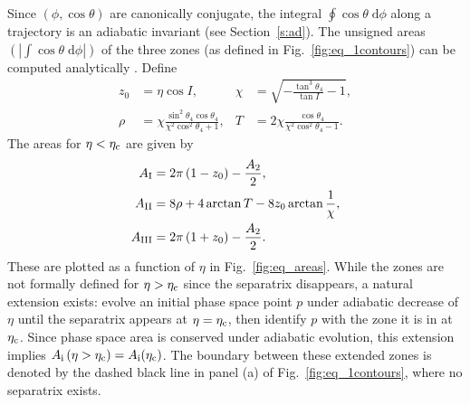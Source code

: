 \documentclass[
        fleqn,
        usenatbib,
    ]{mnras}
\newcommand*{\abs}[1]{\left|#1\right|}
\newcommand*{\p}[1]{\left(#1\right)}
\begin{document}
Since $\p{\phi, \cos \theta}$ are canonically conjugate, the integral $\oint
\cos \theta\;\mathrm{d}\phi$ along a trajectory is an adiabatic invariant (see
Section~\ref{s:ad}). The unsigned areas $\p{\abs{\int \cos \theta
\;\mathrm{d}\phi}}$ of the three zones (as defined in
Fig.~\ref{fig:eq_1contours}) can be computed analytically
\citep{henrard1987,ward2004I}. Define
\begin{subequations}
    \begin{align}
        z_0 &= \eta\cos I, &
        \chi &= \sqrt{-\frac{\tan^3\theta_4}{\tan I} - 1},\\
        \rho &= \chi \frac{\sin^2 \theta_4\cos \theta_4}{
            \chi^2 \cos^2\theta_4 + 1},&
        T &= 2\chi \frac{\cos \theta_4}{
            \chi^2 \cos^2\theta_4 - 1}.
    \end{align}
\end{subequations}
The areas for $\eta < \eta_{\rm c}$ are given by
\begin{subequations}\label{se:area_ward}
    \begin{align}
        A_{\rm I} &= 2\pi\p{1 - z_0} - \frac{A_2}{2}, \label{eq:A1}\\
        A_{\rm II} &= 8\rho + 4\arctan T - 8z_0 \arctan \frac{1}{\chi},
            \label{eq:A2}\\
        A_{\rm III} &= 2\pi\p{1 + z_0} - \frac{A_2}{2}\label{eq:A3}.
    \end{align}
\end{subequations}
These are plotted as a function of $\eta$ in Fig.~\ref{fig:eq_areas}. While the
zones are not formally defined for $\eta > \eta_{\rm c}$ since the separatrix
disappears, a natural extension exists: evolve an initial phase space point $p$
under adiabatic decrease of $\eta$ until the separatrix appears at $\eta =
\eta_{\rm c}$, then identify $p$ with the zone it is in at $\eta_{\rm c}$. Since
phase space area is conserved under adiabatic evolution, this extension implies
$A_{\rm i}\p{\eta > \eta_{\rm c}} = A_{\rm i}(\eta_{\rm c})$. The boundary
between these extended zones is denoted by the dashed black line in panel (a) of
Fig.~\ref{fig:eq_1contours}, where no separatrix exists.
\end{document}
